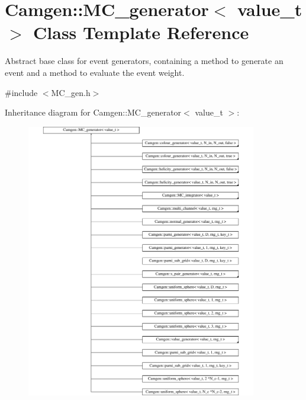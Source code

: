 \hypertarget{a00366}{}\section{Camgen\+:\+:M\+C\+\_\+generator$<$ value\+\_\+t $>$ Class Template Reference}
\label{a00366}


Abstract base class for event generators, containing a method to generate an event and a method to evaluate the event weight.  




{\ttfamily \#include $<$M\+C\+\_\+gen.\+h$>$}

Inheritance diagram for Camgen\+:\+:M\+C\+\_\+generator$<$ value\+\_\+t $>$\+:\begin{figure}[H]
\begin{center}
\leavevmode
\includegraphics[height=12.000000cm]{a00366}
\end{center}
\end{figure}
